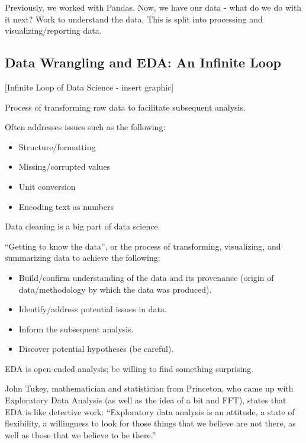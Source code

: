 
Previously, we worked with Pandas. Now, we have our data - what do we do with it next? Work to understand the data. This is split into processing and visualizing/reporting data. 

\subsection{Data Wrangling and EDA: An Infinite Loop}
[Infinite Loop of Data Science - insert graphic]

\begin{definition}{Process of transforming raw data to facilitate subsequent analysis.

Often addresses issues such as the following:
\begin{itemize}
\item Structure/formatting
\item Missing/corrupted values
\item Unit conversion
\item Encoding text as numbers
\end{itemize}

Data cleaning is a big part of data science.
}
\end{definition}

\begin{definition}{``Getting to know the data'', or the process of transforming, visualizing, and summarizing data to achieve the following:
\begin{itemize}
\item Build/confirm understanding of the data and its provenance (origin of data/methodology by which the data was produced).
\item Identify/address potential issues in data.
\item Inform the subsequent analysis.
\item Discover potential hypotheses (be careful).
\end{itemize}

EDA is open-ended analysis; be willing to find something surprising.
}
\end{definition}

John Tukey, mathematician and statistician from Princeton, who came up with Exploratory Data Analysis (as well as the idea of a bit and FFT), states that EDA is like detective work: ``Exploratory data analysis is an attitude, a state of flexibility, a willingness to look for those things that we believe are not there, as well as those that we believe to be there.''

